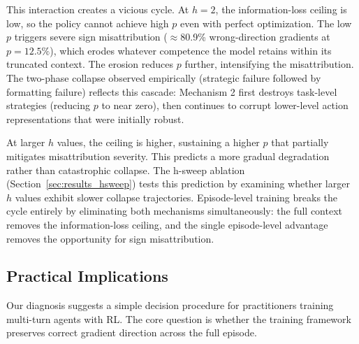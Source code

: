 This interaction creates a vicious cycle. At $h = 2$, the information-loss ceiling is low, so the policy cannot achieve high $p$ even with perfect optimization. The low $p$ triggers severe sign misattribution ($\approx$80.9\% wrong-direction gradients at $p = 12.5\%$), which erodes whatever competence the model retains within its truncated context. The erosion reduces $p$ further, intensifying the misattribution. The two-phase collapse observed empirically (strategic failure followed by formatting failure) reflects this cascade: Mechanism 2 first destroys task-level strategies (reducing $p$ to near zero), then continues to corrupt lower-level action representations that were initially robust.

At larger $h$ values, the ceiling is higher, sustaining a higher $p$ that partially mitigates misattribution severity. This predicts a more gradual degradation rather than catastrophic collapse. The h-sweep ablation (Section~\ref{sec:results_hsweep}) tests this prediction by examining whether larger $h$ values exhibit slower collapse trajectories. Episode-level training breaks the cycle entirely by eliminating both mechanisms simultaneously: the full context removes the information-loss ceiling, and the single episode-level advantage removes the opportunity for sign misattribution.


\subsection{Practical Implications}
\label{sec:practical_implications}

Our diagnosis suggests a simple decision procedure for practitioners training multi-turn agents with RL. The core question is whether the training framework preserves correct gradient direction across the full episode.

